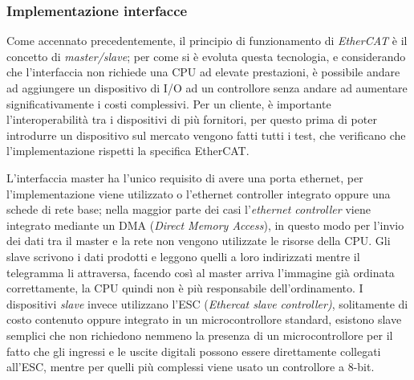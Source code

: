 \subsubsection{Implementazione interfacce}
Come accennato precedentemente, il principio di funzionamento di \textit{EtherCAT} è il concetto di \textit{master/slave}; per come si è evoluta questa tecnologia, e considerando che l'interfaccia non richiede una CPU ad elevate prestazioni, è possibile andare ad aggiungere un dispositivo di I/O ad un controllore senza andare ad aumentare significativamente i costi complessivi. Per un cliente, è importante l'interoperabilità tra i dispositivi di più fornitori, per questo prima di poter introdurre un dispositivo sul mercato vengono fatti tutti i test, che verificano che l'implementazione rispetti la specifica EtherCAT.
\par L'interfaccia master ha l'unico requisito di avere una porta ethernet, per l'implementazione viene utilizzato o l'ethernet controller integrato oppure una schede di rete base; nella maggior parte dei casi l'\textit{ethernet controller} viene integrato mediante un DMA (\textit{Direct Memory Access}), in questo modo per l'invio dei dati tra il master e la rete non vengono utilizzate le risorse della CPU. Gli slave scrivono i dati prodotti e leggono quelli a loro indirizzati mentre il telegramma li attraversa, facendo così al master arriva l'immagine già ordinata correttamente, la CPU quindi non è più responsabile dell'ordinamento. I dispositivi \textit{slave} invece utilizzano l'ESC (\textit{Ethercat slave controller)}, solitamente di costo contenuto oppure integrato in un microcontrollore standard, esistono slave semplici che non richiedono nemmeno la presenza di un microcontrollore per il fatto che gli ingressi e le uscite digitali possono essere direttamente collegati all'ESC, mentre per quelli più complessi viene usato un controllore a 8-bit.
